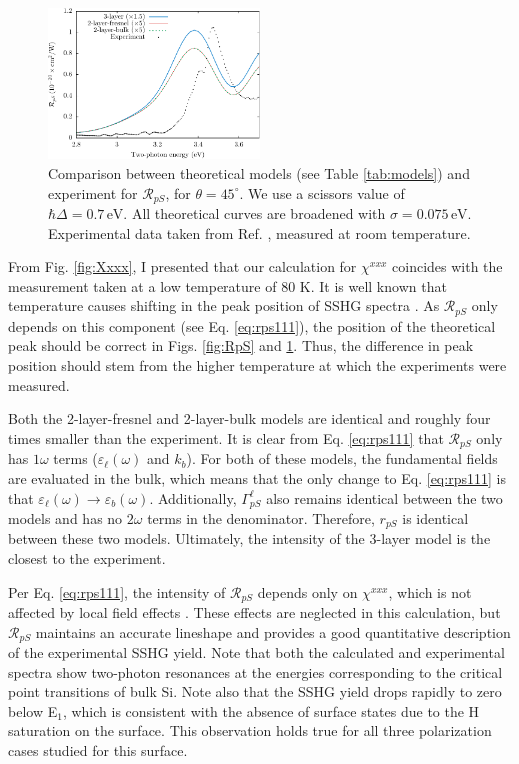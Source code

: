 \begin{figure}[H]
\centering
\includegraphics[width=0.5\textwidth]{content/figures/fig-Si1x1-Mitchell_RpS}
\caption{Comparison between theoretical models (see Table \ref{tab:models}) and experiment for $\mathcal{R}_{pS}$, for $\theta=45^\circ$. We use a scissors value of $\hbar\Delta = 0.7\,\text{eV}$. All theoretical curves are broadened with $\sigma=0.075\,\text{eV}$. Experimental data taken from Ref. \cite{mitchellSS01}, measured at room temperature.}
\label{fig:mitchellRpS}
\end{figure}

From Fig. \ref{fig:Xxxx}, I presented that our calculation for $\chi^{xxx}$ coincides with the measurement taken at a low temperature of 80 K. It is well known that temperature causes shifting in the peak position of SSHG spectra \cite{dadapPRB97}. As $\mathcal{R}_{pS}$ only depends on this component (see Eq. \eqref{eq:rps111}), the position of the theoretical peak should be correct in Figs. \ref{fig:RpS} and \ref{fig:mitchellRpS}. Thus, the difference in peak position should stem from the higher temperature at which the experiments were measured.

Both the 2-layer-fresnel and 2-layer-bulk models are identical and roughly four times smaller than the experiment. It is clear from Eq. \eqref{eq:rps111} that $\mathcal{R}_{pS}$ only has $1\omega$ terms ($\varepsilon_{\ell}(\omega)$ and $k_{b}$). For both of these models, the fundamental fields are evaluated in the bulk, which means that the only change to Eq. \eqref{eq:rps111} is that $\varepsilon_{\ell}(\omega) \rightarrow \varepsilon_{b}(\omega)$. Additionally, $\Gamma^{\ell}_{pS}$ also remains identical between the two models and has no $2\omega$ terms in the denominator. Therefore, $r_{pS}$ is identical between these two models. Ultimately, the intensity of the 3-layer model is the closest to the experiment.

Per Eq. \eqref{eq:rps111}, the intensity of $\mathcal{R}_{pS}$ depends only on $\chi^{xxx}$, which is not affected by local field effects \cite{tancognedejean:tel-01235611}. These effects are neglected in this calculation, but $\mathcal{R}_{pS}$ maintains an accurate lineshape and provides a good quantitative description of the experimental SSHG yield. Note that both the calculated and experimental spectra show two-photon resonances at the energies corresponding to the critical point transitions of bulk Si. Note also that the SSHG yield drops rapidly to zero below E$_{1}$, which is consistent with the absence of surface states due to the H saturation on the surface. This observation holds true for all three polarization cases studied for this surface.

